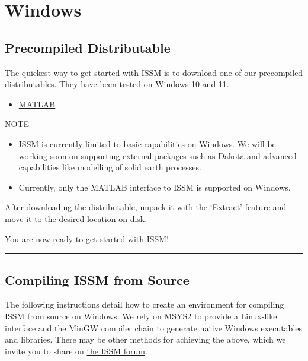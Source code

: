 
\section{Windows} \label{sec:installation-windows}
\subsection{Precompiled Distributable}
The quickest way to get started with ISSM is to download one of our precompiled distributables. They have been tested on Windows 10 and 11.
\begin{itemize}
	\item \href{https://ross.ics.uci.edu/ISSM-Windows-MATLAB.tar.gz}{MATLAB}
\end{itemize}

\begin{calloutHighlight}{NOTE}
\begin{itemize}
	\item ISSM is currently limited to basic capabilities on Windows. We will be working soon on supporting external packages such as Dakota and advanced capabilities like modelling of solid earth processes.
	\item Currently, only the MATLAB interface to ISSM is supported on Windows.
\end{itemize}
\end{calloutHighlight}

After downloading the distributable, unpack it with the `Extract' feature and move it to the desired location on disk.

You are now ready to 
\hyperref[chap:getting-started]{get started with ISSM}!

\vspace{1cm}\hrule

\subsection{Compiling ISSM from Source}
The following instructions detail how to create an environment for compiling ISSM from source on Windows. We rely on MSYS2 to provide a Linux-like interface and the MinGW compiler chain to generate native Windows executables and libraries. There may be other methods for achieving the above, which we invite you to share on \href{https://issm.ess.uci.edu/forum}{the ISSM forum}.

